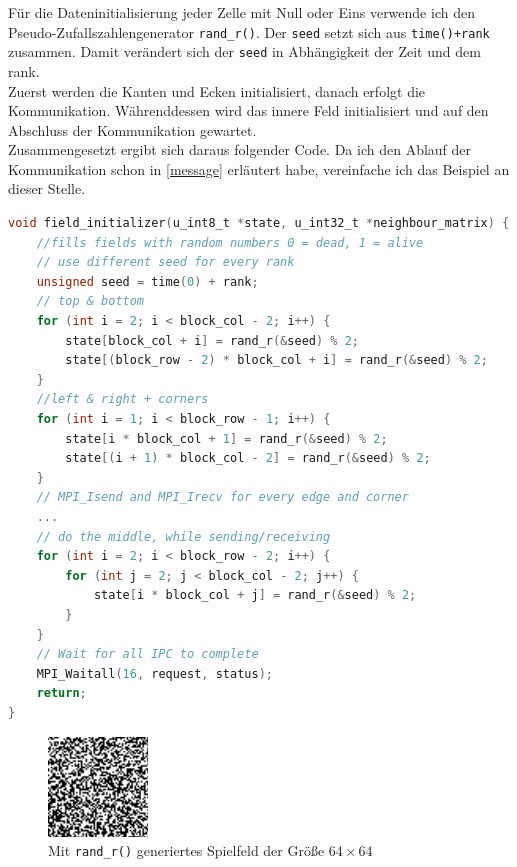 \documentclass[german,plainarticle,hyperref,utf8]{zihpub}
\begin{document}
	Für die Dateninitialisierung jeder Zelle mit Null oder Eins verwende ich den Pseudo-Zufallszahlengenerator \texttt{rand\_r()}. Der \texttt{seed} setzt sich aus \texttt{time()+rank} zusammen. Damit verändert sich der \texttt{seed} in Abhängigkeit der Zeit und dem rank.\\
	Zuerst werden die Kanten und Ecken initialisiert, danach erfolgt die Kommunikation. Währenddessen wird das innere Feld initialisiert und auf den Abschluss der Kommunikation gewartet.\\
	
	Zusammengesetzt ergibt sich daraus folgender Code. Da ich den Ablauf der Kommunikation schon in \ref{message} erläutert habe, vereinfache ich das Beispiel an dieser Stelle.\\
	
	\begin{lstlisting}[language=C, caption=Dateninitialisierung]
void field_initializer(u_int8_t *state, u_int32_t *neighbour_matrix) {
	//fills fields with random numbers 0 = dead, 1 = alive
	// use different seed for every rank
	unsigned seed = time(0) + rank;
	// top & bottom
	for (int i = 2; i < block_col - 2; i++) {
		state[block_col + i] = rand_r(&seed) % 2;
		state[(block_row - 2) * block_col + i] = rand_r(&seed) % 2;
	}
	//left & right + corners
	for (int i = 1; i < block_row - 1; i++) {
		state[i * block_col + 1] = rand_r(&seed) % 2;
		state[(i + 1) * block_col - 2] = rand_r(&seed) % 2;
	}
	// MPI_Isend and MPI_Irecv for every edge and corner
	...
	// do the middle, while sending/receiving
	for (int i = 2; i < block_row - 2; i++) {
		for (int j = 2; j < block_col - 2; j++) {
			state[i * block_col + j] = rand_r(&seed) % 2;
		}
	}
	// Wait for all IPC to complete
	MPI_Waitall(16, request, status);
	return;
}\end{lstlisting}
	\begin{figure}[h]
		\begin{center}
			\includegraphics[scale=5.0]{initialized_board.pdf}
		\end{center}
		\caption{Mit \texttt{rand\_r()} generiertes Spielfeld der Größe $64\times 64$}
	\end{figure}
	
\end{document}
